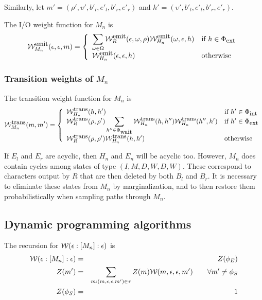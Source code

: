\documentclass{article}
\newcommand{\seclabel}[1]{\label{sec.#1}}
\newcommand\wtrans[4]{#1(#2 : [#3] : #4)}
\newcommand\States{\Phi}
\newcommand\statesof[1]{\States_{#1}}
\newcommand\Transitions{\tau}
\newcommand\startstate{\phi_S}
\newcommand\laststate{\phi_E}
\newcommand\weight{{\cal W}}
\newcommand\weightfunof[1]{\weight_{#1}}
\newcommand\transweightfun[1]{\weightfunof{#1}^{\mbox{\small trans}}}
\newcommand\emitweightfun[1]{\weightfunof{#1}^{\mbox{\small emit}}}
\newcommand\stateset[1]{\statesof{\mbox{\small #1}}}
\newcommand\hstatedest{(\upsilon',b'_l,e'_l,b'_r,e'_r)}
\newcommand\externalsuffix{ext}
\newcommand\internalsuffix{int}
\newcommand\waitsuffix{wait}
\newcommand\externalcascades{\stateset{\externalsuffix}}
\newcommand\internalcascades{\stateset{\internalsuffix}}
\newcommand\waitstates{\stateset{\waitsuffix}}
\newcommand\mstatedest{(\rho',\upsilon',b'_l,e'_l,b'_r,e'_r)}
\begin{document}
Similarly, let $m' = \mstatedest$ and $h' = \hstatedest$.

The I/O weight function for $M_n$ is
\[
\emitweightfun{M_n}(\epsilon,\epsilon,m) = \left\{
\begin{array}{ll}
\displaystyle
\sum_{\omega \in \Omega} \emitweightfun{R}(\epsilon,\omega,\rho) \emitweightfun{H_n}(\omega,\epsilon,h)
 & \mbox{if $h \in \externalcascades$} \\
\emitweightfun{H_n}(\epsilon,\epsilon,h)
 & \mbox{otherwise}
\end{array}
\right.
\]

\subsubsection{Transition weights of $M_n$}
The transition weight function for $M_n$ is
\[
\transweightfun{M_n}(m,m') = \left\{
\begin{array}{ll}
\displaystyle
\transweightfun{H_n}(h,h')
 & \mbox{if $h' \in \internalcascades$} \\
\displaystyle
\transweightfun{R}(\rho,\rho') \sum_{h'' \in \waitstates} \transweightfun{H_n}(h,h'') \transweightfun{H_n}(h'',h')
 & \mbox{if $h' \in \externalcascades$} \\
\transweightfun{R}(\rho,\rho') \transweightfun{H_n}(h,h')
 & \mbox{otherwise}
\end{array}
\right.
\]

If $E_l$ and $E_r$ are acyclic, then $H_n$ and $E_n$ will be acyclic too.
However, $M_n$ does contain cycles among states of type $(I,M,D,W,D,W)$.
These correspond to characters output by $R$ that are then deleted by both $B_l$ and $B_r$.
It is necessary to eliminate these states from $M_n$ by marginalization, and to then restore them probabilistically when sampling paths through $M_n$.

\subsection{Dynamic programming algorithms}
\seclabel{DynamicProgramming}
The recursion for $\wtrans{\weight}{\epsilon}{M_n}{\epsilon}$ is
\begin{eqnarray*}
\wtrans{\weight}{\epsilon}{M_n}{\epsilon} & = & Z(\laststate) \\
Z(m') & = & \sum_{m : (m,\epsilon,\epsilon,m') \in \Transitions} Z(m) \weightfunof{}(m,\epsilon,\epsilon,m')  \quad\quad \forall m' \neq \startstate \\
Z(\startstate) & = & 1
\end{eqnarray*}
\end{document}
